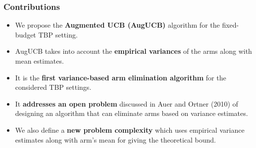 \begin{frame}
\frametitle{Contributions}
\begin{itemize}
\item<1-> We propose the \textbf{Augmented UCB (AugUCB)} algorithm for the fixed-budget TBP setting.
\item<2-> AugUCB takes into account the \textbf{empirical variances} of the arms along with mean estimates.
\item<3-> It is the \textbf{first variance-based arm elimination algorithm} for the considered TBP settings. 
\item<4-> It \textbf{addresses an open problem} discussed in {Auer and Ortner (2010)} of designing an algorithm that can eliminate arms based on variance estimates.
\item<5-> We also define a \textbf{new problem complexity} which uses empirical variance estimates along with arm's mean for giving the theoretical bound.
\end{itemize}
\end{frame}


%


